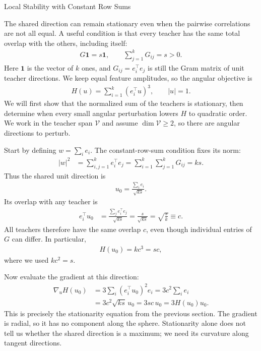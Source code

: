 \documentclass[11pt, reqno]{amsart}
\makeatletter
\def\section{\@startsection{section}{1}%
  \z@{.7\linespacing\@plus\linespacing}{.5\linespacing}%
  {\normalfont\scshape\centering}}
\theoremstyle{notestyle}
\theoremstyle{defstyle}
\makeatother
\begin{document}
\section{Local Stability with Constant Row Sums}
\label{sec:constant-row-sum-stability}

The shared direction can remain stationary even when the pairwise correlations are not all equal.
A useful condition is that every teacher has the same total overlap with the others, including itself:
\begin{align*}
    G\mathbf 1=s\mathbf 1,
    \qquad \sum_{j=1}^k G_{ij}=s>0.
\end{align*}
Here $\mathbf 1$ is the vector of $k$ ones, and $G_{ij}=e_i^\top e_j$ is still the Gram matrix of unit teacher directions.
We keep equal feature amplitudes, so the angular objective is
\begin{align*}
    H(u)=\sum_{i=1}^k(e_i^\top u)^3,
    \qquad |u|=1.
\end{align*}
We will first show that the normalized sum of the teachers is stationary, then determine when every small angular perturbation lowers $H$ to quadratic order.
We work in the teacher span $\mathcal V$ and assume $\dim\mathcal V\geq2$, so there are angular directions to perturb.

Start by defining $w=\sum_i e_i$.
The constant-row-sum condition fixes its norm:
\begin{align*}
    |w|^2
    &=\sum_{i,j=1}^k e_i^\top e_j
    =\sum_{i=1}^k\sum_{j=1}^k G_{ij}
    =ks.
\end{align*}
Thus the shared unit direction is
\begin{align*}
    u_0=\frac{\sum_i e_i}{\sqrt{ks}}.
\end{align*}
Its overlap with any teacher is
\begin{align*}
    e_i^\top u_0
    &=\frac{\sum_j e_i^\top e_j}{\sqrt{ks}}
    =\frac{s}{\sqrt{ks}}
    =\sqrt{\frac{s}{k}}
    \equiv c.
\end{align*}
All teachers therefore have the same overlap $c$, even though individual entries of $G$ can differ.
In particular,
\begin{align*}
    H(u_0)=kc^3=sc,
\end{align*}
where we used $kc^2=s$.

Now evaluate the gradient at this direction:
\begin{align*}
    \nabla_u H(u_0)
    &=3\sum_i(e_i^\top u_0)^2e_i
    =3c^2\sum_i e_i \\
    &=3c^2\sqrt{ks}\,u_0
    =3sc\,u_0
    =3H(u_0)u_0.
\end{align*}
This is precisely the stationarity equation from the previous section.
The gradient is radial, so it has no component along the sphere.
Stationarity alone does not tell us whether the shared direction is a maximum; we need its curvature along tangent directions.
\end{document}
